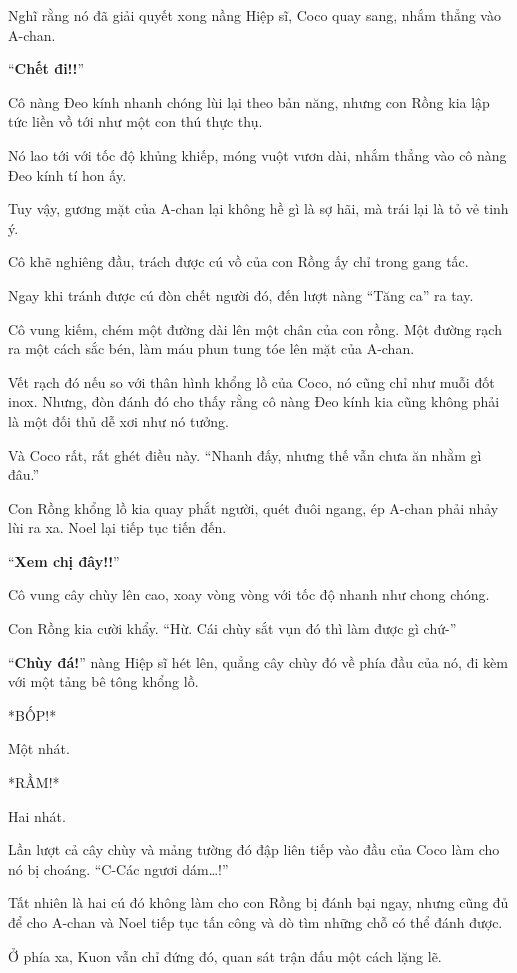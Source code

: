 \documentclass[../main.tex]{subfiles}
\begin{document}
Nghĩ rằng nó đã giải quyết xong nầng Hiệp sĩ, Coco quay sang, nhắm thẳng vào A-chan.

``\textbf{Chết đi!!}''

Cô nàng Đeo kính nhanh chóng lùi lại theo bản năng, nhưng con Rồng kia lập tức liền vồ tới như một con thú thực thụ.

Nó lao tới với tốc độ khủng khiếp, móng vuột vươn dài, nhắm thẳng vào cô nàng Đeo kính tí hon ấy.

Tuy vậy, gương mặt của A-chan lại không hề gì là sợ hãi, mà trái lại là tỏ vẻ tinh ý.

Cô khẽ nghiêng đầu, trách được cú vồ của con Rồng ấy chỉ trong gang tấc.

Ngay khi tránh được cú đòn chết người đó, đến lượt nàng ``Tăng ca'' ra tay.

Cô vung kiếm, chém một đường dài lên một chân của con rồng. Một đường rạch ra một cách sắc bén, làm máu phun tung tóe lên mặt của A-chan.

Vết rạch đó nếu so với thân hình khổng lồ của Coco, nó cũng chỉ như muỗi đốt inox. Nhưng, đòn đánh đó cho thấy rằng cô nàng Đeo kính kia cũng không phải là một đối thủ dễ xơi như nó tưởng.

Và Coco rất, rất ghét điều này. ``Nhanh đấy, nhưng thế vẫn chưa ăn nhằm gì đâu.''

Con Rồng khổng lồ kia quay phắt người, quét đuôi ngang, ép A-chan phải nhảy lùi ra xa. Noel lại tiếp tục tiến đến.

``\textbf{Xem chị đây!!}''

Cô vung cây chùy lên cao, xoay vòng vòng với tốc độ nhanh như chong chóng.

Con Rồng kia cười khẩy. ``Hừ. Cái chùy sắt vụn đó thì làm được gì chứ-''

``\textbf{Chùy đá!}'' nàng Hiệp sĩ hét lên, quẳng cây chùy đó về phía đầu của nó, đi kèm với một tảng bê tông khổng lồ.

*BỐP!*

Một nhát.

*RẦM!*

Hai nhát.

Lần lượt cả cây chùy và mảng tường đó đập liên tiếp vào đầu của Coco làm cho nó bị choáng. ``C-Các ngươi dám\dots!''

Tất nhiên là hai cú đó không làm cho con Rồng bị đánh bại ngay, nhưng cũng đủ để cho A-chan và Noel tiếp tục tấn công và dò tìm những chỗ có thể đánh được.

Ở phía xa, Kuon vẫn chỉ đứng đó, quan sát trận đấu một cách lặng lẽ.
\end{document}
